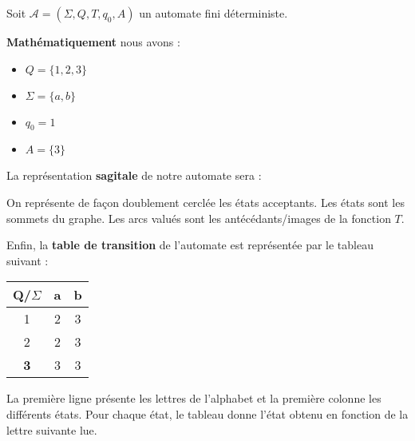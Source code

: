 \begin{example}
    Soit $\mathcal{A} = (\Sigma, Q, T, q_0, A)$ un automate fini déterministe. 

    \textbf{Mathématiquement} nous avons :
    \begin{itemize}
        \item $Q = \{1,2,3\}$ 
        \item $\Sigma = \{a,b\}$ 
        \item $q_0 = 1$ 
        \item $A = \{3\}$ 
    \end{itemize}
    
    La représentation \textbf{sagitale}  de notre automate sera :
        
        \begin{center}
            \begin{figure}[h]
                \centering
            \end{figure}
        \end{center}

    On représente de façon doublement cerclée les états acceptants. Les états sont les sommets du graphe. 
    Les arcs valués sont les antécédants/images de la fonction $T$. 

    Enfin, la \textbf{table de transition} de l'automate est représentée par le tableau suivant :
    \begin{multicols}{2}
        \begin{center}
            \begin{tabular}{c|c|c}
                Q/$\Sigma$ & a & b \\ \hline 
                1 & 2 & 3 \\ \hline 
                2 & 2 & 3 \\ \hline 
                \textbf{3} & 3 & 3 
            \end{tabular}
        \end{center}

        La première ligne présente les lettres de l'alphabet et la première colonne les différents états. 
        Pour chaque état, le tableau donne l'état obtenu en fonction de la lettre suivante lue. 
    \end{multicols}
\end{example}

